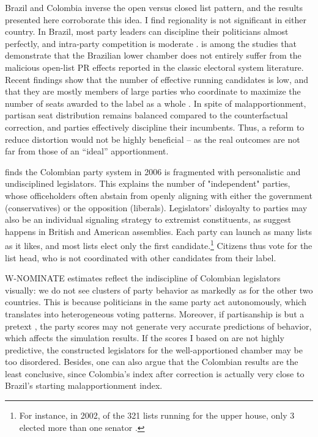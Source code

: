 \documentclass[a4paper,12pt]{article}
\begin{document}
Brazil and Colombia inverse the open versus closed list pattern, and the results presented here corroborate this idea. I find regionality is not significant in either country. In Brazil, most party leaders can discipline their politicians almost perfectly, and intra-party competition is moderate \citep{figueiredo2000presidential}. \cite{desposato2006impact} is among the studies that demonstrate that the Brazilian lower chamber does not entirely suffer from the malicious open-list PR effects reported in the classic electoral system literature. Recent findings show that the number of effective running candidates is low, and that they are mostly members of large parties who coordinate to maximize the number of seats awarded to the label as a whole \citep{cheibub2020preference}. In spite of malapportionment, partisan seat distribution remains balanced compared to the counterfactual correction, and parties effectively discipline their incumbents. Thus, a reform to reduce distortion would not be highly beneficial -- as the real outcomes are not far from those of an ``ideal'' apportionment.

\citet{leongomez2006giants} finds the Colombian party system in 2006 is fragmented with personalistic and undisciplined legislators. This explains the number of "independent" parties, whose officeholders often abstain from openly aligning with either the government (conservatives) or the opposition (liberals). Legislators' disloyalty to parties may also be an individual signaling strategy to extremist constituents, as \citet{kirkland2018roll} suggest happens in British and American assemblies. Each party can launch as many lists as it likes, and most lists elect only the first candidate.\footnote{For instance, in 2002, of the 321 lists running for the upper house, only 3 elected more than one senator \citep{leongomez2006giants}.} Citizens thus vote for the list head, who is not coordinated with other candidates from their label. 

W-NOMINATE estimates reflect the indiscipline of Colombian legislators visually: we do not see clusters of party behavior as markedly as for the other two countries. This is because politicians in the same party act autonomously, which translates into heterogeneous voting patterns. Moreover, if partisanship is but a pretext \citep{leongomez2006giants}, the party scores may not generate very accurate predictions of behavior, which affects the simulation results. If the scores I based on are not highly predictive, the constructed legislators for the well-apportioned chamber may be too disordered. Besides, one can also argue that the Colombian results are the least conclusive, since Colombia's index after correction is actually very close to Brazil's starting malapportionment index.
\end{document}
